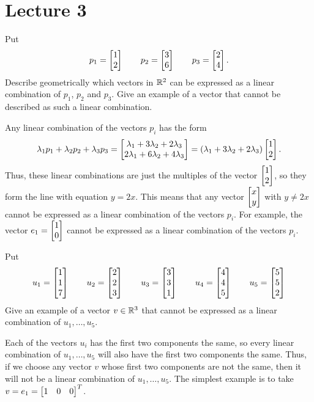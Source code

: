 \documentclass[a4paper]{amsart}
\renewenvironment{solution}{\SolutionInline}{\endSolutionInline}
\begin{document}
\section{Lecture 3}

\begin{exercise}\label{ex-combination-i}
 Put 
 \[ p_1 = \left[\begin{matrix} 1 \\ 2 \end{matrix}\right] \qquad
    p_2 = \left[\begin{matrix} 3 \\ 6 \end{matrix}\right] \qquad
    p_3 = \left[\begin{matrix} 2 \\ 4 \end{matrix}\right].
 \]
 Describe geometrically which vectors in ${\mathbb{R}}^2$ can be expressed as a
 linear combination of $p_1$, $p_2$ and $p_3$.  Give an example of a
 vector that cannot be described as such a linear combination.
\end{exercise}
\begin{solution}
 Any linear combination of the vectors $p_i$ has the form 
 \[ \lambda_1p_1 + \lambda_2p_2 + \lambda_3p_3 =
     \left[\begin{matrix} \lambda_1+3\lambda_2+2\lambda_3 \\
          2\lambda_1+6\lambda_2+4\lambda_3 \end{matrix}\right] = 
     (\lambda_1+3\lambda_2+2\lambda_3)\left[\begin{matrix} 1 \\ 2 \end{matrix}\right].
 \]
 Thus, these linear combinations are just the multiples of the vector
 $\left[\begin{matrix} 1\\ 2\end{matrix}\right]$, so they form the line with equation $y=2x$.  This
 means that any vector $\left[\begin{matrix} x\\ y\end{matrix}\right]$ with $y\neq 2x$ cannot be
 expressed as a linear combination of the vectors $p_i$.  For example,
 the vector $e_1=\left[\begin{matrix} 1\\ 0\end{matrix}\right]$ cannot be expressed as a linear
 combination of the vectors $p_i$.
\end{solution}

\begin{exercise}\label{ex-combination-ii}
 Put 
 \[ u_1 = \left[\begin{matrix} 1 \\ 1 \\ 7 \end{matrix}\right] \qquad
    u_2 = \left[\begin{matrix} 2 \\ 2 \\ 3 \end{matrix}\right] \qquad
    u_3 = \left[\begin{matrix} 3 \\ 3 \\ 1 \end{matrix}\right] \qquad
    u_4 = \left[\begin{matrix} 4 \\ 4 \\ 5 \end{matrix}\right] \qquad
    u_5 = \left[\begin{matrix} 5 \\ 5 \\ 2 \end{matrix}\right] 
 \]
 Give an example of a vector $v\in{\mathbb{R}}^3$ that cannot be expressed as a
 linear combination of $u_1,\dotsc,u_5$.
\end{exercise}
\begin{solution}
 Each of the vectors $u_i$ has the first two components the same, so
 every linear combination of $u_1,\dotsc,u_5$ will also have the first
 two components the same.  Thus, if we choose any vector $v$ whose
 first two components are not the same, then it will not be a linear
 combination of $u_1,\dotsc,u_5$.  The simplest example is to take
 $v=e_1=\left[\begin{matrix} 1&0&0\end{matrix}\right]^T$.
\end{solution}
\end{document}
